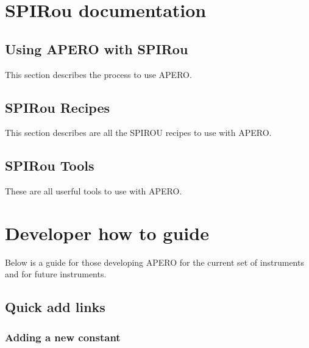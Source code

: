 \documentclass[a4paper,10pt,english]{report}
\begin{document}
\chapter{SPIRou documentation}
\label{\detokenize{user/spirou:spirou-documentation}}\label{\detokenize{user/spirou:spirou-main}}\label{\detokenize{user/spirou::doc}}

\section{Using APERO with SPIRou}
\label{\detokenize{user/spirou/using_apero_spirou:using-apero-with-spirou}}\label{\detokenize{user/spirou/using_apero_spirou:using-apero-spirou}}\label{\detokenize{user/spirou/using_apero_spirou::doc}}
This section describes the process to use APERO.


\section{SPIRou Recipes}
\label{\detokenize{user/spirou/recipes_spirou:spirou-recipes}}\label{\detokenize{user/spirou/recipes_spirou:recipes-spirou}}\label{\detokenize{user/spirou/recipes_spirou::doc}}
This section describes are all the SPIROU recipes to use with APERO.


\section{SPIRou Tools}
\label{\detokenize{user/spirou/tools_spirou:spirou-tools}}\label{\detokenize{user/spirou/tools_spirou:tools-spirou}}\label{\detokenize{user/spirou/tools_spirou::doc}}
These are all userful tools to use with APERO.


\chapter{Developer how to guide}
\label{\detokenize{dev/developer_guide:developer-how-to-guide}}\label{\detokenize{dev/developer_guide:dev-main}}\label{\detokenize{dev/developer_guide::doc}}
Below is a guide for those developing APERO for the current set of instruments
and for future instruments.


\section{Quick add links}
\label{\detokenize{dev/developer_guide:quick-add-links}}

\subsection{Adding a new constant}
\label{\detokenize{dev/adding_new_constant:adding-a-new-constant}}\label{\detokenize{dev/adding_new_constant:add-new-constant}}\label{\detokenize{dev/adding_new_constant::doc}}
\end{document}
